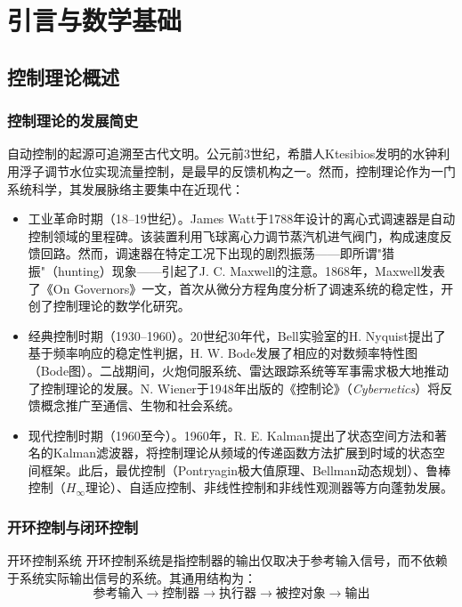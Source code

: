 \chapter{引言与数学基础}


\section{控制理论概述}

\subsection{控制理论的发展简史}

自动控制的起源可追溯至古代文明。公元前3世纪，希腊人Ktesibios发明的水钟利用浮子调节水位实现流量控制，是最早的反馈机构之一。然而，控制理论作为一门系统科学，其发展脉络主要集中在近现代：

\begin{itemize}
\item 工业革命时期（18--19世纪）。James Watt于1788年设计的离心式调速器是自动控制领域的里程碑。该装置利用飞球离心力调节蒸汽机进气阀门，构成速度反馈回路。然而，调速器在特定工况下出现的剧烈振荡——即所谓"猎振"（hunting）现象——引起了J. C. Maxwell的注意。1868年，Maxwell发表了《On Governors》一文，首次从微分方程角度分析了调速系统的稳定性，开创了控制理论的数学化研究。
\item 经典控制时期（1930--1960）。20世纪30年代，Bell实验室的H. Nyquist提出了基于频率响应的稳定性判据，H. W. Bode发展了相应的对数频率特性图（Bode图）。二战期间，火炮伺服系统、雷达跟踪系统等军事需求极大地推动了控制理论的发展。N. Wiener于1948年出版的《控制论》（\emph{Cybernetics}）将反馈概念推广至通信、生物和社会系统。
\item 现代控制时期（1960至今）。1960年，R. E. Kalman提出了状态空间方法和著名的Kalman滤波器，将控制理论从频域的传递函数方法扩展到时域的状态空间框架。此后，最优控制（Pontryagin极大值原理、Bellman动态规划）、鲁棒控制（$H_{\infty}$理论）、自适应控制、非线性控制和非线性观测器等方向蓬勃发展。
\end{itemize}

\subsection{开环控制与闭环控制}

\begin{mydefinition}{开环控制系统}
开环控制系统是指控制器的输出仅取决于参考输入信号，而不依赖于系统实际输出信号的系统。其通用结构为：
\[
\text{参考输入} \rightarrow \text{控制器} \rightarrow \text{执行器} \rightarrow \text{被控对象} \rightarrow \text{输出}
\]
\end{mydefinition}


